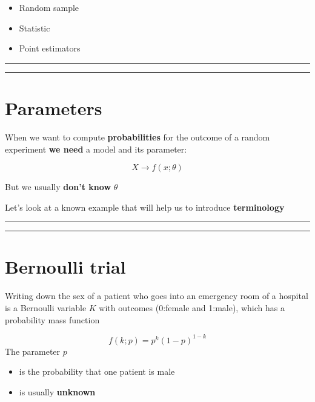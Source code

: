 \documentclass[
]{book}
\providecommand{\tightlist}{%
  \setlength{\itemsep}{0pt}\setlength{\parskip}{0pt}}
\begin{document}
\begin{itemize}
\tightlist
\item
  Random sample
\item
  Statistic
\item
  Point estimators
\end{itemize}

\begin{center}\rule{0.5\linewidth}{0.5pt}\end{center}

\begin{center}\rule{0.5\linewidth}{0.5pt}\end{center}

\hypertarget{parameters}{%
\section{Parameters}\label{parameters}}

When we want to compute \textbf{probabilities} for the outcome of a random experiment \textbf{we need} a model and its parameter:

\[X \rightarrow f(x; \theta)\]

But we usually \textbf{don't know} \(\theta\)

Let's look at a known example that will help us to introduce \textbf{terminology}

\begin{center}\rule{0.5\linewidth}{0.5pt}\end{center}

\begin{center}\rule{0.5\linewidth}{0.5pt}\end{center}

\hypertarget{bernoulli-trial-4}{%
\section{Bernoulli trial}\label{bernoulli-trial-4}}

Writing down the sex of a patient who goes into an emergency room of a hospital is a Bernoulli variable \(K\) with outcomes (0:female and 1:male), which has a probability mass function

\[f(k; p)=p^k(1-p)^{1-k} \]
The parameter \(p\)

\begin{itemize}
\item
  is the probability that one patient is male
\item
  is usually \textbf{unknown}
\end{itemize}
\end{document}
